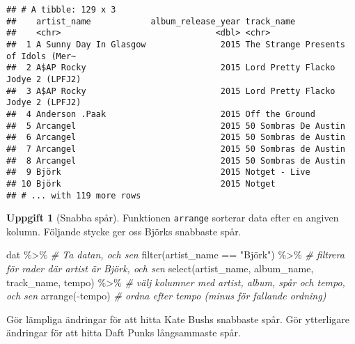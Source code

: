 \documentclass[
]{book}
\newenvironment{Shaded}{\begin{snugshade}}{\end{snugshade}}
\newcommand{\CommentTok}[1]{\textcolor[rgb]{0.56,0.35,0.01}{\textit{#1}}}
\newcommand{\FunctionTok}[1]{\textcolor[rgb]{0.00,0.00,0.00}{#1}}
\newcommand{\NormalTok}[1]{#1}
\newcommand{\SpecialCharTok}[1]{\textcolor[rgb]{0.00,0.00,0.00}{#1}}
\newcommand{\StringTok}[1]{\textcolor[rgb]{0.31,0.60,0.02}{#1}}
\theoremstyle{definition}
\theoremstyle{definition}
\theoremstyle{definition}
\newtheorem{exercise}{Uppgift}[chapter]
\theoremstyle{definition}
\theoremstyle{remark}
\begin{document}
\begin{verbatim}
## # A tibble: 129 x 3
##    artist_name            album_release_year track_name                         
##    <chr>                               <dbl> <chr>                              
##  1 A Sunny Day In Glasgow               2015 The Strange Presents of Idols (Mer~
##  2 A$AP Rocky                           2015 Lord Pretty Flacko Jodye 2 (LPFJ2) 
##  3 A$AP Rocky                           2015 Lord Pretty Flacko Jodye 2 (LPFJ2) 
##  4 Anderson .Paak                       2015 Off the Ground                     
##  5 Arcangel                             2015 50 Sombras De Austin               
##  6 Arcangel                             2015 50 Sombras de Austin               
##  7 Arcangel                             2015 50 Sombras de Austin               
##  8 Arcangel                             2015 50 Sombras de Austin               
##  9 Björk                                2015 Notget - Live                      
## 10 Björk                                2015 Notget                             
## # ... with 119 more rows
\end{verbatim}

\begin{exercise}[Snabba spår]
Funktionen \texttt{arrange} sorterar data efter en angiven kolumn. Följande stycke ger oss Björks snabbaste spår.

\begin{Shaded}
\begin{Highlighting}[]
\NormalTok{dat }\SpecialCharTok{\%\textgreater{}\%}                                                    \CommentTok{\# Ta datan, och sen}
  \FunctionTok{filter}\NormalTok{(artist\_name }\SpecialCharTok{==} \StringTok{"Björk"}\NormalTok{) }\SpecialCharTok{\%\textgreater{}\%}                       \CommentTok{\# filtrera för rader där artist är Björk, och sen}
  \FunctionTok{select}\NormalTok{(artist\_name, album\_name, track\_name, tempo) }\SpecialCharTok{\%\textgreater{}\%}   \CommentTok{\# välj kolumner med artist, album, spår och tempo, och sen}
  \FunctionTok{arrange}\NormalTok{(}\SpecialCharTok{{-}}\NormalTok{tempo)                                          }\CommentTok{\# ordna efter tempo (minus för fallande ordning)}
\end{Highlighting}
\end{Shaded}

Gör lämpliga ändringar för att hitta Kate Bushs snabbaste spår. Gör ytterligare ändringar för att hitta Daft Punks långsammaste spår.
\end{exercise}
\end{document}
